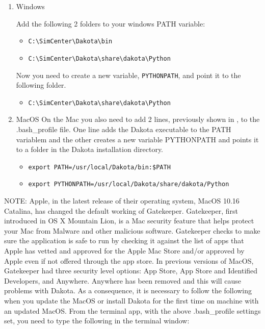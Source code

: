 \begin{enumerate}
\item{Windows}

Add the following 2 folders to your windows PATH variable:
\begin{itemize}
    \item \texttt{C:\textbackslash SimCenter\textbackslash Dakota\textbackslash bin}
    \item \texttt{C:\textbackslash SimCenter\textbackslash Dakota\textbackslash share\textbackslash dakota\textbackslash Python}
\end{itemize}

Now you need to create a new variable, \texttt{PYTHONPATH}, and point it to the following folder.


\begin{itemize}
    \item \texttt{C:\textbackslash SimCenter\textbackslash Dakota\textbackslash share\textbackslash dakota\textbackslash Python}
\end{itemize}

\item{MacOS}
On the Mac you also need to add 2 lines, previously shown in ,
 to the .bash\_profile file. One line adds the Dakota executable to the PATH variablem and 
the other creates a new variable PYTHONPATH and points it to a folder in the  Dakota 
installation directory. 

\begin{itemize}
    \item \texttt{export PATH=/usr/local/Dakota/bin:\${PATH}}
    \item \texttt{export PYTHONPATH=/usr/local/Dakota/share/dakota/Python}
\end{itemize}
\end{enumerate}

NOTE: Apple, in the latest release of their operating system, MacOS 10.16 Catalina, has changed the default working of Gatekeeper.
Gatekeeper, first introduced in OS X Mountain Lion, is a Mac security feature that helps protect your Mac from Malware and other malicious software. Gatekeeper checks to make sure the application is safe to run by checking it against the list of apps that Apple has vetted and approved for the Apple Mac Store and/or approved by Apple even if not offered through the app store. In previous versions of MacOS, Gatekeeper had three security level options: App Store, App Store and Identified Developers, and Anywhere. Anywhere has been removed and this will cause problems with Dakota. As a consequence, it is necessary to follow the following when you update the MacOS or install Dakota for the first time on machine with an updated MacOS. From the terminal app, with the above .bash\_profile settings set, you need to type the following in the terminal window:

